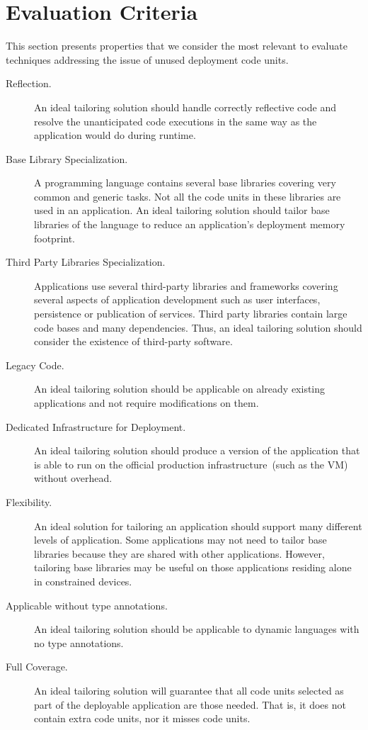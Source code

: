 \section{Evaluation Criteria}\label{sec:tailoring_criteria}

This section presents properties that we consider the most relevant to evaluate techniques addressing the issue of unused deployment code units.

\begin{description}

\item[Reflection.] An ideal tailoring solution should handle correctly reflective code and resolve the unanticipated code executions in the same way as the application would do during runtime.

\item[Base Library Specialization.] A programming language contains several base libraries covering very common and generic tasks. Not all the code units in these libraries are used in an application. An ideal tailoring solution should tailor base libraries of the language to reduce an application's deployment memory footprint.

\item[Third Party Libraries Specialization.] Applications use several third-party libraries and frameworks covering several aspects of application development such as user interfaces, persistence or publication of services. Third party libraries contain large code bases and many dependencies. Thus, an ideal tailoring solution should consider the existence of third-party software.

\item[Legacy Code.] An ideal tailoring solution should be applicable on already existing applications and not require modifications on them.

\item[Dedicated Infrastructure for Deployment.] An ideal tailoring solution should produce a version of the application that is able to run on the official production infrastructure~(such as the VM) without overhead.

\item[Flexibility.] An ideal solution for tailoring an application should support many different levels of application. Some applications may not need to tailor base libraries because they are shared with other applications. However, tailoring base libraries may be useful on those applications residing alone in constrained devices.

\item[Applicable without type annotations.] An ideal tailoring solution should be applicable to dynamic languages with no type annotations.

\item[Full Coverage.] An ideal tailoring solution will guarantee that all code units selected as part of the deployable application are those needed. That is, it does not contain extra code units, nor it misses code units.

\end{description}

